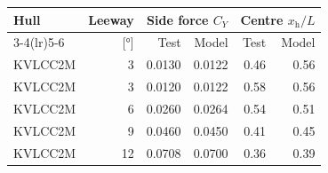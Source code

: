 \begin{tabular}{@{}lrrrrr@{}}
\toprule
Hull & Leeway & \multicolumn{2}{c}{Side force \(C_Y\)} & \multicolumn{2}{c}{Centre \(x_\mathrm{h}/L\)} \\
\cmidrule(lr){3-4}\cmidrule(lr){5-6}
 & [\si{\degree}] & Test & Model & Test & Model \\
\midrule
KVLCC2M & 3 & 0.0130 & 0.0122 & 0.46 & 0.56 \\
KVLCC2M & 3 & 0.0120 & 0.0122 & 0.58 & 0.56 \\
KVLCC2M & 6 & 0.0260 & 0.0264 & 0.54 & 0.51 \\
KVLCC2M & 9 & 0.0460 & 0.0450 & 0.41 & 0.45 \\
KVLCC2M & 12 & 0.0708 & 0.0700 & 0.36 & 0.39 \\
\bottomrule
\end{tabular}
